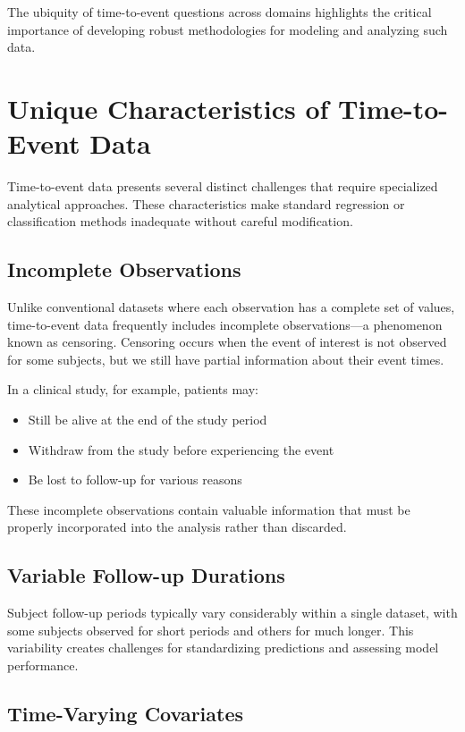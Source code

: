 The ubiquity of time-to-event questions across domains highlights the critical importance of developing robust methodologies for modeling and analyzing such data.

\section{Unique Characteristics of Time-to-Event Data}

Time-to-event data presents several distinct challenges that require specialized analytical approaches. These characteristics make standard regression or classification methods inadequate without careful modification.

\subsection{Incomplete Observations}

Unlike conventional datasets where each observation has a complete set of values, time-to-event data frequently includes incomplete observations—a phenomenon known as censoring. Censoring occurs when the event of interest is not observed for some subjects, but we still have partial information about their event times.

In a clinical study, for example, patients may:
\begin{itemize}
\item Still be alive at the end of the study period
\item Withdraw from the study before experiencing the event
\item Be lost to follow-up for various reasons
\end{itemize}

These incomplete observations contain valuable information that must be properly incorporated into the analysis rather than discarded.

\subsection{Variable Follow-up Durations}

Subject follow-up periods typically vary considerably within a single dataset, with some subjects observed for short periods and others for much longer. This variability creates challenges for standardizing predictions and assessing model performance.

\subsection{Time-Varying Covariates}

